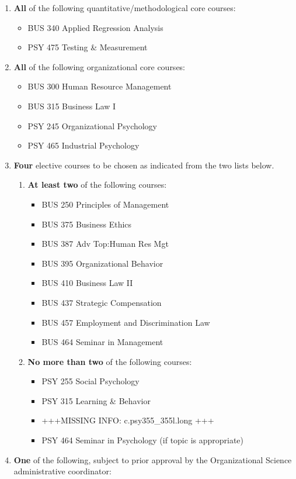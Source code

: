 \documentclass[
  letterpaper,
]{scrbook}
\providecommand{\tightlist}{%
  \setlength{\itemsep}{0pt}\setlength{\parskip}{0pt}}
\begin{document}
\begin{enumerate}
\def\labelenumi{\arabic{enumi}.}
\item
  \textbf{All} of the following quantitative/methodological core
  courses:

  \begin{itemize}
  \tightlist
  \item
    BUS 340 Applied Regression Analysis
  \item
    PSY 475 Testing \& Measurement
  \end{itemize}
\item
  \textbf{All} of the following organizational core courses:

  \begin{itemize}
  \tightlist
  \item
    BUS 300 Human Resource Management
  \item
    BUS 315 Business Law I
  \item
    PSY 245 Organizational Psychology
  \item
    PSY 465 Industrial Psychology
  \end{itemize}
\item
  \textbf{Four} elective courses to be chosen as indicated from the two
  lists below.

  \begin{enumerate}
  \def\labelenumii{\alph{enumii}.}
  \tightlist
  \item
    \textbf{At least two} of the following courses:

    \begin{itemize}
    \tightlist
    \item
      BUS 250 Principles of Management
    \item
      BUS 375 Business Ethics
    \item
      BUS 387 Adv Top:Human Res Mgt
    \item
      BUS 395 Organizational Behavior
    \item
      BUS 410 Business Law II
    \item
      BUS 437 Strategic Compensation
    \item
      BUS 457 Employment and Discrimination Law
    \item
      BUS 464 Seminar in Management
    \end{itemize}
  \item
    \textbf{No more than two} of the following courses:

    \begin{itemize}
    \tightlist
    \item
      PSY 255 Social Psychology
    \item
      PSY 315 Learning \& Behavior
    \item
      +++MISSING INFO: c.psy355\_355l.long +++
    \item
      PSY 464 Seminar in Psychology (if topic is appropriate)
    \end{itemize}
  \end{enumerate}
\item
  \textbf{One} of the following, subject to prior approval by the
  Organizational Science administrative coordinator:


\end{enumerate}
\end{document}
